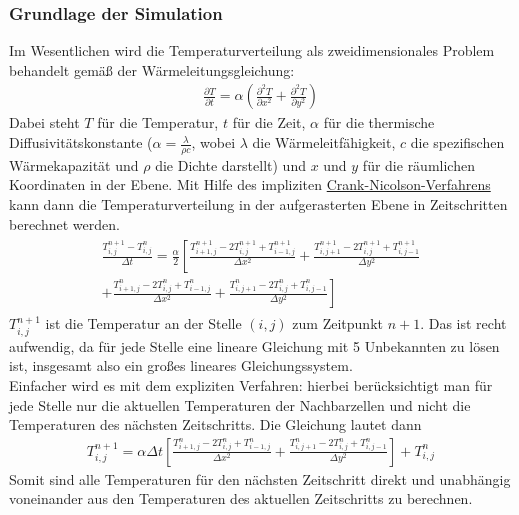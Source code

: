 \documentclass[12pt,a4paper]{article}
\begin{document}
\subsubsection{Grundlage der Simulation}
Im Wesentlichen wird die Temperaturverteilung als zweidimensionales Problem behandelt gemäß der Wärmeleitungsgleichung:
 \begin{align}
 \frac{\partial T}{\partial t} = \alpha \left( \frac{\partial^2 T}{\partial x^2} + \frac{\partial^2 T}{\partial y^2} \right)
 \end{align}
Dabei steht $T$ für die Temperatur, $t$ für die Zeit, $\alpha$ für die thermische Diffusivitätskonstante ($\alpha=\frac{\lambda}{\rho c}$, wobei $\lambda$ die Wärmeleitfähigkeit, $c$ die spezifischen Wärmekapazität und $\rho$ die Dichte darstellt) und $x$ und $y$ für die räumlichen Koordinaten in der Ebene.
Mit Hilfe des impliziten \href{https://de.wikipedia.org/wiki/Crank-Nicolson-Verfahren#Beispiel:_Zweidimensionale_Diffusion}{Crank-Nicolson-Verfahrens} kann dann die Temperaturverteilung in der aufgerasterten Ebene in Zeitschritten berechnet werden.
 \begin{align}
 \begin{split}
\frac{T_{i,j}^{n+1} - T_{i,j}^n}{\Delta t} = \frac{\alpha}{2} \left[ \frac{T_{i+1,j}^{n+1} - 2T_{i,j}^{n+1} + T_{i-1,j}^{n+1}}{\Delta x^2} + \frac{T_{i,j+1}^{n+1} - 2T_{i,j}^{n+1} + T_{i,j-1}^{n+1}}{\Delta y^2} \right. \\
\left. + \frac{T_{i+1,j}^n - 2T_{i,j}^n + T_{i-1,j}^n}{\Delta x^2} + \frac{T_{i,j+1}^n - 2T_{i,j}^n + T_{i,j-1}^n}{\Delta y^2} \right]
\end{split}
\end{align}
$T_{i,j}^{n+1}$ ist die Temperatur an der Stelle $(i,j)$ zum Zeitpunkt $n+1$. Das ist recht aufwendig, da für jede Stelle eine lineare Gleichung mit 5 Unbekannten zu lösen ist, insgesamt also ein großes lineares Gleichungssystem.\\
Einfacher wird es mit dem expliziten Verfahren: hierbei berücksichtigt man für jede Stelle nur die aktuellen Temperaturen der Nachbarzellen und nicht die Temperaturen des nächsten Zeitschritts. Die Gleichung lautet dann 
\begin{align}
T_{i,j}^{n+1}  = \alpha \Delta t \left[ 
\frac{T_{i+1,j}^n - 2T_{i,j}^n + T_{i-1,j}^n}{\Delta x^2} + \frac{T_{i,j+1}^n - 2T_{i,j}^n + T_{i,j-1}^n}{\Delta y^2} \right] + T_{i,j}^n
\end{align}
Somit sind alle Temperaturen für den nächsten Zeitschritt direkt und unabhängig voneinander aus den Temperaturen des aktuellen Zeitschritts zu berechnen.\\
\end{document}
